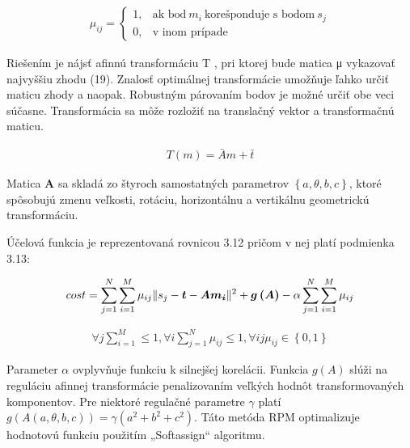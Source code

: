 \begin{equation}
\label{eq10}
\begin{aligned}
\mu_{ij}=
\begin{cases}
1, & \text{ak bod}\ m_i\ \text{korešponduje s bodom}\ s_j \\
0, & \text{v inom prípade}
\end{cases}
\end{aligned}
\end{equation}

Riešením je nájsť afinnú transformáciu T , pri ktorej bude matica μ vykazovať najvyššiu zhodu (19). Znalosť optimálnej transformácie umožňuje ľahko určiť maticu zhody a naopak. Robustným párovaním bodov je možné určiť obe veci súčasne. Transformácia sa môže rozložiť na translačný vektor a transformačnú maticu.

\begin{equation}
\label{eq11}
\begin{aligned}
T\left(m\right)=\bar{A}m+\bar{t}
\end{aligned}
\end{equation}

Matica \textbf{A} sa skladá zo štyroch samostatných parametrov $\left\lbrace a, \theta, b, c \right\rbrace$, ktoré spôsobujú zmenu veľkosti, rotáciu, horizontálnu a vertikálnu geometrickú transformáciu.

Účelová funkcia je reprezentovaná rovnicou 3.12 pričom v nej platí podmienka 3.13:

\begin{equation}
\label{eq12}
\begin{aligned}
cost=\sum_{j=1}^{N}\sum_{i=1}^{M} \mu_{ij} \Arrowvert s_j - \boldsymbol{t} - \boldsymbol{Am_i} \Arrowvert^2 + \boldsymbol{g\left(A\right)} -\alpha \sum_{j=1}^{N}\sum_{i=1}^{M} \mu_{ij}
\end{aligned}
\end{equation}

\begin{equation}
\label{eq13}
\begin{aligned}
\forall j \sum_{i=1}^{M} \leq 1, \forall i \sum_{j=1}^{N} \mu_{ij} \leq 1, \forall ij \mu_{ij} \in \left\lbrace 0,1 \right\rbrace 
\end{aligned}
\end{equation}

Parameter $\alpha$ ovplyvňuje funkciu k silnejšej korelácii. Funkcia $g\left(A\right)$ slúži na reguláciu afinnej transformácie penalizovaním veľkých hodnôt transformovaných komponentov. Pre niektoré regulačné parametre $\gamma$ platí $g\left(A\left(a, \theta, b, c\right)\right) = \gamma \left(a^2 + b^2 + c^2 \right)$. Táto metóda RPM optimalizuje hodnotovú funkciu použitím „Softassign“ algoritmu.

